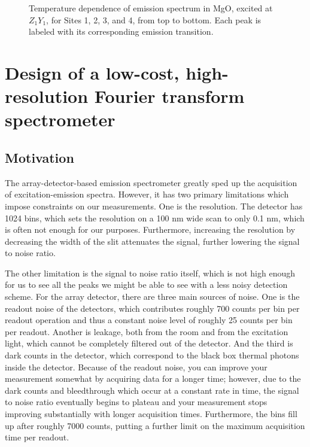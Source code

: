 \documentclass[12pt]{report}
\begin{document}
\begin{figure}[t]
{  }{}
  \caption{Temperature dependence of emission spectrum in MgO, excited at $Z_{1}Y_{1}$, for Sites 1, 2, 3, and 4, from top to bottom. Each peak is labeled with its corresponding emission transition.}
  \label{fig:mgotemp}
\end{figure}



\chapter{Design of a low-cost, high-resolution Fourier transform spectrometer}

\section{Motivation}

The array-detector-based emission spectrometer greatly sped up the acquisition of excitation-emission spectra. However, it has two primary limitations which impose constraints on our measurements. One is the resolution. The detector has 1024 bins, which sets the resolution on a 100 nm wide scan to only 0.1 nm, which is often not enough for our purposes. Furthermore, increasing the resolution by decreasing the width of the slit attenuates the signal, further lowering the signal to noise ratio.

The other limitation is the signal to noise ratio itself, which is not high enough for us to see all the peaks we might be able to see with a less noisy detection scheme. For the array detector, there are three main sources of noise. One is the readout noise of the detectors, which contributes roughly 700 counts per bin per readout operation and thus a constant noise level of roughly 25 counts per bin per readout. Another is leakage, both from the room and from the excitation light, which cannot be completely filtered out of the detector. And the third is dark counts in the detector, which correspond to the black box thermal photons inside the detector. Because of the readout noise, you can improve your measurement somewhat by acquiring data for a longer time; however, due to the dark counts and bleedthrough which occur at a constant rate in time, the signal to noise ratio eventually begins to plateau and your measurement stops improving substantially with longer acquisition times. Furthermore, the bins fill up after roughly 7000 counts, putting a further limit on the maximum acquisition time per readout.
\end{document}
